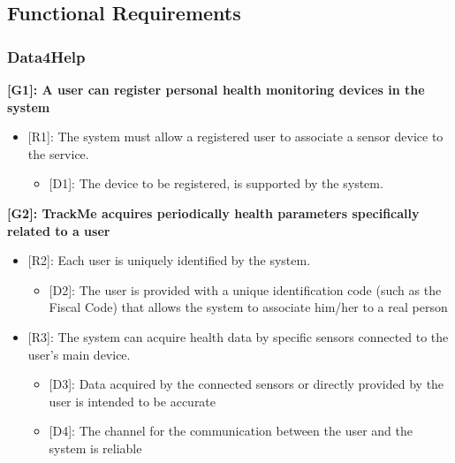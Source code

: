 {\color{Blue}\subsection{Functional Requirements}}

{\color{Blue}\subsubsection{Data4Help}}
\raggedright
\textbf{[G1]: A user can register personal health monitoring devices in the system}
\begin{itemize}[partopsep=0.7 cm]
	\item {[R1]: The system must allow a registered user to associate a sensor device to the service.}
\begin{itemize}
	\item{[D1]: The device to be registered, is supported by the system.}
\end{itemize}
\end{itemize}
\textbf{[G2]: TrackMe acquires periodically health parameters specifically related to a user}
\begin{itemize}
	\item {[R2]: Each user is uniquely identified by the system.}
	\begin{itemize}
		\item {[D2]: The user is provided with a unique identification code (such as the Fiscal Code) that allows the system to associate him/her to a real person}
	\end{itemize}
	\item {[R3]: The system can acquire health data by specific sensors connected to the user's main device.}
	\begin{itemize}
		\item {[D3]: Data acquired by the connected sensors or directly provided by the user is intended to be accurate}
		\item {[D4]: The channel for the communication between the user and the system is reliable}
	\end{itemize}
\end{itemize}

